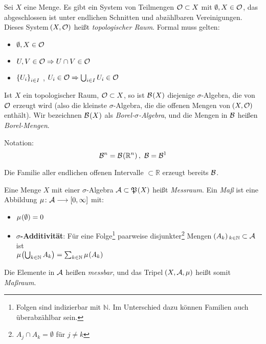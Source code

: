 \documentclass[skript.tex]{subfiles}
\begin{document}
	\begin{defin}
		Sei $X$ eine Menge. Es gibt ein System von Teilmengen $\mathcal{O} \subset X$ mit $\emptyset,X \in \mathcal{O}$, das abgeschlossen ist unter endlichen Schnitten und abzählbaren Vereinigungen. Dieses System $\pr{X,\mc{O}}$ heißt \textit{topologischer Raum}. Formal muss gelten:
		\begin{itemize}
			\item $\emptyset, X \in \mathcal{O}$
			\item $U,V \in \mathcal{O} \Rightarrow U\cap V \in \mathcal{O}$
			\item $\left\{U_i\right\}_{i\in I}$ , $U_i \in \mathcal{O} \Rightarrow \bigcup_{i\in I} U_i \in \mathcal{O}$
		\end{itemize}
	\end{defin}
	
	\begin{defin}
		Ist $X$ ein topologischer Raum, $\mathcal{O}\subset X$, so ist $\mc{B}\pr{X}$ diejenige $\sigma$-Algebra, die von $\mathcal{O}$ erzeugt wird (also die kleinste $\sigma$-Algebra, die die offenen Mengen von $\pr{X,\mc{O}}$ enthält). Wir bezeichnen $\mc{B}\pr{X}$ als \textit{Borel-$\sigma$-Algebra}, und die Mengen in $\mathcal{B}$ heißen \textit{Borel-Mengen}.
		
		Notation:
		\begin{equation*}
			\mc{B}^n = \mc{B}\pr{\mathbb{R}^n},\ \mc{B} = \mc{B}^1
		\end{equation*}
	\end{defin}

	\begin{bem*}
		Die Familie aller endlichen offenen Intervalle $\subset \mathbb{R}$ erzeugt bereits $\mathcal{B}$.
	\end{bem*}
	
	\begin{defin}
		Eine Menge $X$ mit einer $\sigma$-Algebra $\mc{A} \subset \mf{P}\pr{X}$ heißt \textit{Messraum}. Ein \textit{Maß} ist eine Abbildung $\mu\colon \mathcal{A} \longrightarrow \left[ 0, \infty \right]$ mit:
		\begin{itemize}
			\item $\mu\pr{\emptyset} = 0$
			\item \textbf{\boldmath$\sigma$-Additivität}: Für eine Folge\footnote{Folgen sind indizierbar mit $\mathbb{N}$. Im Unterschied dazu können Familien auch überabzählbar sein.} paarweise disjunkter\footnote{$A_j \cap A_k = \emptyset$ für $j\neq k$} Mengen $\pr{A_k}_{k\in \mathbb{N}} \subset \mc{A}$ ist \\ $\mu\pr{\bigcup_{k\in\mathbb{N}} A_k } = \sum_{k\in\mathbb{N}} \mu\pr{A_k}$
		\end{itemize}
		Die Elemente in $\mathcal{A}$ heißen \textit{messbar}, und das Tripel $\pr{X, \mc{A}, \mu}$ heißt somit \textit{Maßraum}.
	\end{defin}
	
\end{document}
